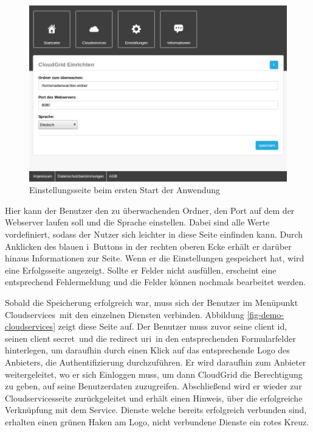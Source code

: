 \begin{figure}[H]
  \centering
  \includegraphics[scale=0.4]{resources/Bilder_Kapitel_6/first-start.png}
  \caption{Einstellungsseite beim ersten Start der Anwendung}
  \label{fig-demo-first-start}
\end{figure}

Hier kann der Benutzer den zu überwachenden Ordner, den Port auf dem der Webserver laufen soll und die Sprache einstellen.
Dabei sind alle Werte vordefiniert, sodass der Nutzer sich leichter in diese Seite einfinden kann.
Durch Anklicken des blauen \frqq i\flqq\ Buttons in der rechten oberen Ecke erhält er darüber hinaus Informationen zur Seite.
Wenn er die Einstellungen gespeichert hat, wird eine Erfolgsseite angezeigt.
Sollte er Felder nicht ausfüllen, erscheint eine entsprechend Fehlermeldung und die Felder können nochmals bearbeitet werden.

Sobald die Speicherung erfolgreich war, muss sich der Benutzer im Menüpunkt \frqq Cloudservices\flqq\ mit den einzelnen Diensten verbinden.
Abbildung \ref{fig-demo-cloudservices} zeigt diese Seite auf.
Der Benutzer muss zuvor seine \frqq client id\frqq , seinen \frqq client secret\flqq\ und die \frqq redirect uri\flqq\ in den entsprechenden Formularfelder hinterlegen, um daraufhin durch einen Klick auf das entsprechende Logo des Anbieters, die Authentifizierung durchzuführen.
Er wird daraufhin zum Anbieter weitergeleitet, wo er sich Einloggen muss, um dann CloudGrid die Berechtigung zu geben, auf seine Benutzerdaten zuzugreifen.
Abschließend wird er wieder zur Cloudservicesseite zurückgeleitet und erhält einen Hinweis, über die erfolgreiche Verknüpfung mit dem Service.
Dienste welche bereits erfolgreich verbunden sind, erhalten einen grünen Haken am Logo, nicht verbundene Dienste ein rotes Kreuz.


